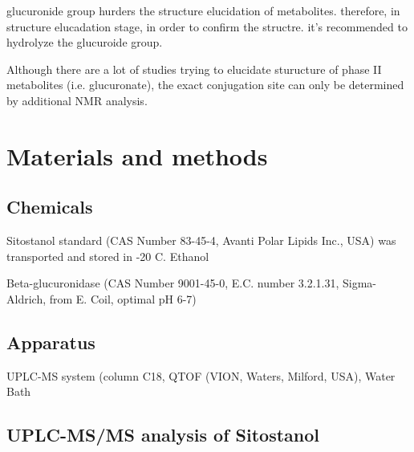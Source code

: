 glucuronide group hurders the structure elucidation of metabolites.
therefore, in structure elucadation stage, in order to confirm the structre. it's recommended to hydrolyze the glucuroide group.

Although there are a lot of studies trying to elucidate sturucture of phase II metabolites (i.e. glucuronate), the exact conjugation site can only be determined by additional NMR analysis. 

\section{Materials and methods}
\subsection{Chemicals}
Sitostanol standard (CAS Number 83-45-4, Avanti Polar Lipids Inc., USA) was transported and stored in -20 \degree C. Ethanol

Beta-glucuronidase (CAS Number 9001-45-0, E.C. number 3.2.1.31, Sigma-Aldrich, from E. Coil, optimal pH 6-7)

\subsection{Apparatus}
UPLC-MS system (column C18, QTOF (VION, Waters, Milford, USA), Water Bath


\subsection{UPLC-MS/MS analysis of Sitostanol}

